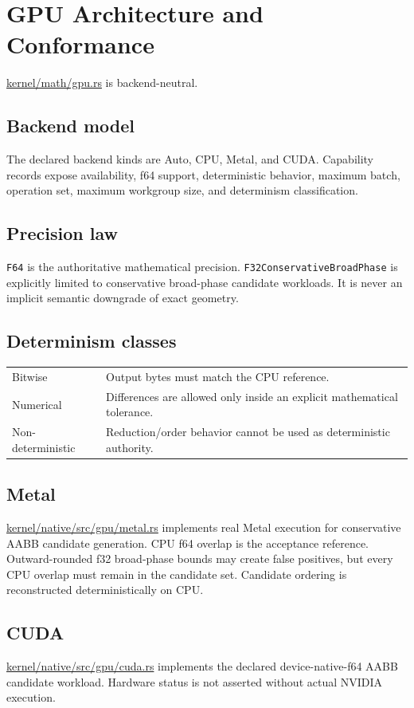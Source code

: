 \documentclass[11pt,a4paper]{report}
\newcommand{\pathref}[1]{\url{#1}}
\begin{document}
\chapter{GPU Architecture and Conformance}

\pathref{kernel/math/gpu.rs} is backend-neutral.

\section{Backend model}
The declared backend kinds are Auto, CPU, Metal, and CUDA. Capability records expose availability, f64 support, deterministic behavior, maximum batch, operation set, maximum workgroup size, and determinism classification.

\section{Precision law}
\texttt{F64} is the authoritative mathematical precision. \texttt{F32ConservativeBroadPhase} is explicitly limited to conservative broad-phase candidate workloads. It is never an implicit semantic downgrade of exact geometry.

\section{Determinism classes}
\begin{tabularx}{\textwidth}{@{}p{}X@{}}
\toprule
Bitwise & Output bytes must match the CPU reference. \\
Numerical & Differences are allowed only inside an explicit mathematical tolerance. \\
Non-deterministic & Reduction/order behavior cannot be used as deterministic authority. \\
\bottomrule
\end{tabularx}

\section{Metal}
\pathref{kernel/native/src/gpu/metal.rs} implements real Metal execution for conservative AABB candidate generation. CPU f64 overlap is the acceptance reference. Outward-rounded f32 broad-phase bounds may create false positives, but every CPU overlap must remain in the candidate set. Candidate ordering is reconstructed deterministically on CPU.

\section{CUDA}
\pathref{kernel/native/src/gpu/cuda.rs} implements the declared device-native-f64 AABB candidate workload. Hardware status is not asserted without actual NVIDIA execution.
\end{document}
